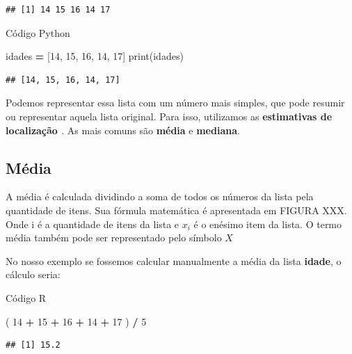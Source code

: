 \documentclass[
]{book}
\newenvironment{Shaded}{\begin{snugshade}}{\end{snugshade}}
\newcommand{\BuiltInTok}[1]{#1}
\newcommand{\DecValTok}[1]{\textcolor[rgb]{0.00,0.00,0.81}{#1}}
\newcommand{\NormalTok}[1]{#1}
\newcommand{\OperatorTok}[1]{\textcolor[rgb]{0.81,0.36,0.00}{\textbf{#1}}}
\newcommand{\SpecialCharTok}[1]{\textcolor[rgb]{0.81,0.36,0.00}{\textbf{#1}}}
\begin{document}
\begin{verbatim}
## [1] 14 15 16 14 17
\end{verbatim}

Código Python

\begin{Shaded}
\begin{Highlighting}[]
\NormalTok{idades }\OperatorTok{=}\NormalTok{ [}\DecValTok{14}\NormalTok{, }\DecValTok{15}\NormalTok{, }\DecValTok{16}\NormalTok{, }\DecValTok{14}\NormalTok{, }\DecValTok{17}\NormalTok{]}
\BuiltInTok{print}\NormalTok{(idades)}
\end{Highlighting}
\end{Shaded}

\begin{verbatim}
## [14, 15, 16, 14, 17]
\end{verbatim}

Podemos representar essa lista com um número mais simples, que pode resumir ou representar aquela lista original. Para isso, utilizamos as \textbf{estimativas de localização \citep{bruce2020practical}}. As mais comuns são \textbf{média} e \textbf{mediana}.

\hypertarget{muxe9dia}{%
\subsection{Média}\label{muxe9dia}}

A média é calculada dividindo a soma de todos os números da lista pela quantidade de itens. Sua fórmula matemática é apresentada em FIGURA XXX. Onde i é a quantidade de itens da lista e \(x_i\) é o enésimo item da lista. O termo média também pode ser representado pelo símbolo \(X\)

No nosso exemplo se fossemos calcular manualmente a média da lista \textbf{idade}, o cálculo seria:

Código R

\begin{Shaded}
\begin{Highlighting}[]
\NormalTok{( }\DecValTok{14} \SpecialCharTok{+} \DecValTok{15} \SpecialCharTok{+} \DecValTok{16} \SpecialCharTok{+} \DecValTok{14} \SpecialCharTok{+} \DecValTok{17}\NormalTok{ ) }\SpecialCharTok{/} \DecValTok{5}
\end{Highlighting}
\end{Shaded}

\begin{verbatim}
## [1] 15.2
\end{verbatim}
\end{document}
